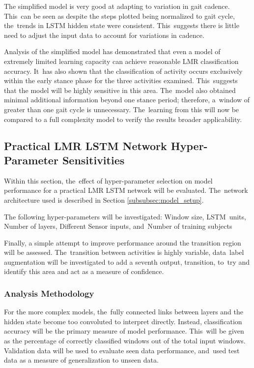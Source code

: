 The simplified model is very good at adapting to variation in gait cadence. This~can be seen as despite the steps plotted being normalized to gait cycle, the~trends in LSTM hidden state were consistent. This~suggests there is little need to adjust the input data to account for variations in cadence.

Analysis of the simplified model has demonstrated that even a model of extremely limited learning capacity can achieve reasonable LMR classification accuracy. It~has also shown that the classification of activity occurs exclusively within the early stance phase for the three activities examined. This~suggests that the model will be highly sensitive in this area. The~model also obtained minimal additional information beyond one stance period; therefore, a~window of greater than one gait cycle is unnecessary. The~learning from this will now be compared to a full complexity model to verify the results broader applicability.


\subsection{Practical LMR LSTM Network Hyper-Parameter Sensitivities}
\label{sec:full_complexity}
Within this section, the~effect of hyper-parameter selection on model performance for a practical LMR LSTM network will be evaluated. The~network architecture used is described in Section \ref{subsubsec:model_setup}.

The following hyper-parameters will be investigated: Window size, LSTM~units, Number of layers, Different Sensor inputs, and~Number of training subjects

Finally, a simple attempt to improve performance around the transition region will be assessed. The~transition between activities is highly variable, data~label augmentation will be investigated to add a seventh output, transition, to~try and identify this area and act as a measure of confidence.

\subsubsection{Analysis Methodology}
For the more complex models, the~fully connected links between layers and the hidden state become too convoluted to interpret directly. Instead, classification accuracy will be the primary measure of model performance. This~will be given as the percentage of correctly classified windows out of the total input windows. Validation data will be used to evaluate seen data performance, and~used test data as a measure of generalization to unseen data. 

